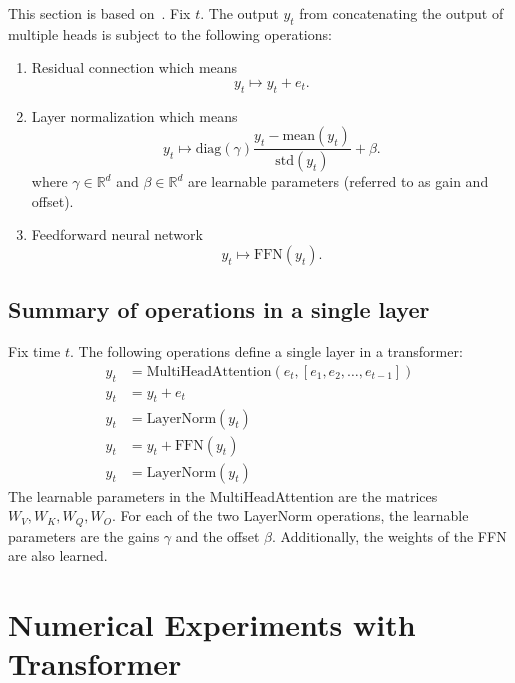 \documentclass[twoside,11pt]{article}
\def\Re{\mathbb{R}}
\newcommand{\field}[1]{\mathbb{#1}}
\def\Re{\field{R}}
\def\Re{\mathbb{R}}
\renewcommand{\Re}{\mathbb{R}}
\begin{document}
  This section is based on~\citep[Ch.,~10]{jm3}.  Fix $t$. The output $y_t$ from concatenating the output of multiple heads is subject to the following operations:
  \begin{enumerate}
  \item Residual connection which means
    \begin{equation*}
 y_t\mapsto y_t + e_t.
    \end{equation*}
  \item Layer normalization which means
    \begin{equation*}
  y_t\mapsto \text{diag}(\gamma) \frac{y_t-\text{mean}(y_t)}{\text{std}(y_t)} + \beta.
  \end{equation*}
  where $\gamma\in\Re^d$ and $\beta\in\Re^d$ are learnable parameters (referred to as gain and offset).
\item Feedforward neural network
  \begin{equation*}
  y_t\mapsto \text{FFN}(y_t).
  \end{equation*}
\end{enumerate}


\subsection{Summary of operations in a single layer}

 Fix time $t$.  The following operations define a single layer in a transformer:
 \begin{align*}
   y_t & = \text{MultiHeadAttention}(e_t,[e_1,e_2,\hdots,e_{t-1}])\\
   y_t & = y_t + e_t \\
   y_t &= \text{LayerNorm}(y_t) \\
   y_t & = y_t + \text{FFN}(y_t) \\
   y_t & = \text{LayerNorm}(y_t)
 \end{align*}
 The learnable parameters in the MultiHeadAttention are the matrices $W_V,W_K,W_Q,W_O$.  For each of the two LayerNorm operations, the learnable parameters are the gains $\gamma$ and the offset $\beta$.  Additionally, the weights of the FFN are also learned.   


\section{Numerical Experiments with Transformer}
\label{sec:app_transformer}
\end{document}
